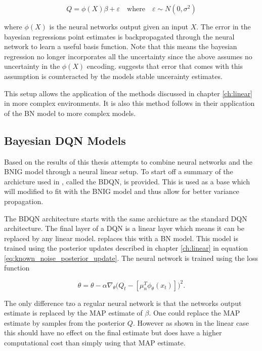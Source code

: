 \begin{equation*}
	Q = \phi(X)\beta + \varepsilon \quad \text{where} \quad \varepsilon \sim N(0,\sigma^2)
\end{equation*}

where $\phi(X)$ is the neural networks output given an input $X$. The error in the bayesian regressions point estimates is backpropagated through the neural network to learn a useful basis function. Note that this means the bayesian regression no longer incorporates all the uncertainty since the above assumes no uncertainty in the $\phi(X)$ encoding. \cite{carlos_2018} suggests that error that comes with this assumption is counteracted by the models stable uncerainty estimates.

This setup allows the application of the methods discussed in chapter \ref{ch:linear} in more complex environments. It is also this method \cite{azziz_2018} follows in their application of the BN model to more complex models.

\subsection{Bayesian DQN Models}

Based on the results of \cite{carlos_2018} this thesis attempts to combine neural networks and the BNIG model through a neural linear setup. To start off a summary of the archicture used in \cite{azziz_2018}, called the BDQN, is provided. This is used as a base which will modified to fit with the BNIG model and thus allow for better variance propagation.

The BDQN architecture starts with the same archicture as the standard DQN architecture\citep{mnih_2015}. The final layer of a DQN is a linear layer which means it can be replaced by any linear model. \cite{azziz_2018} replaces this with a BN model. This model is trained using the posterior updates described in chapter \ref{ch:linear} in equation \ref{eq:known_noise_posterior_update}. The neural network is trained using the loss function

\begin{equation*}
	\theta = \theta - \alpha\nabla_\theta\big(Q_t - [\mu_n^T\phi_\theta(x_t)]\big)^2.
\end{equation*}

The only difference tzo a regular neural network is that the networks output estimate is replaced by the MAP estimate of $\beta$. One could replace the MAP estimate by samples from the posterior $Q$. However as shown in the linear case this should have no effect on the final estimate but does have a higher computational cost than simply using that MAP estimate.

